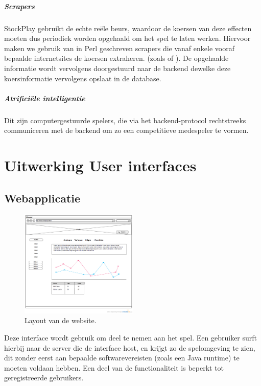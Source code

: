 \subparagraph{Scrapers}
StockPlay gebruikt de echte reële beurs, waardoor de koersen van deze effecten moeten dus periodiek worden opgehaald om het spel te laten werken. Hiervoor maken we gebruik van in Perl geschreven scrapers die vanaf enkele vooraf bepaalde internetsites de koersen extraheren. (zoals  of ).
De opgehaalde informatie wordt vervolgens doorgestuurd naar de backend dewelke deze koersinformatie vervolgens opslaat in de database.

\subparagraph{Atrifici\"ele intelligentie}

Dit zijn computergestuurde spelers, die via het backend-protocol rechtstreeks communiceren met de backend om zo een competitieve medespeler te vormen.


\section{Uitwerking User interfaces}

\subsection{Webapplicatie}

\begin{figure}[h!]
	\centering
		\includegraphics[width=0.5\textwidth]{images/ontwerp/screenshot_website}
	\caption{Layout van de website.}
\end{figure}

Deze interface wordt gebruik om deel te nemen aan het spel. Een gebruiker surft hierbij naar de server die de interface host, en krijgt zo de spelomgeving te zien, dit zonder eerst aan bepaalde softwarevereisten (zoals een Java runtime) te moeten voldaan hebben. Een deel van de functionaliteit is beperkt tot geregistreerde gebruikers.

